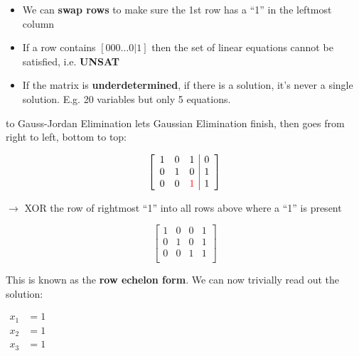\documentclass[aspectratio=196]{slides}
\def\TITLE#1{\hbox to \linewidth{\large #1\hfill}}
\def\BOTTOM{\vfill\newpage}
\def\SLIDE#1{\BOTTOM\TITLE{#1}}
\begin{document}
\begin{itemize}
\item We can \textbf{swap rows} to make sure the 1st row has a ``1'' in the leftmost column
\item If a row contains $[000\ldots0|1]$ then the set of linear equations cannot be satisfied, i.e. \textbf{UNSAT}
\item If the matrix is \textbf{underdetermined}, if there is a solution, it's never a single solution. E.g. 20 variables but only 5 equations.
\end{itemize}


\vfill
\newpage

\SLIDE{Gauss-Jordan Elimination}
Gauss-Jordan Elimination lets Gaussian Elimination finish, then goes from right to left, bottom to top:


\begin{minipage}{0.2\linewidth}
\[
\left[
\begin{array}{lll|l}
1 &            0 &           1 & 0\\
0 &            1 &           0 & 1\\
0 &            0 &           \color{red}{1} & 1\\
\end{array}
\right]
\]
\end{minipage}
\begin{minipage}{0.4\linewidth}
$\rightarrow$ XOR the row of rightmost ``1'' into all rows above where a ``1'' is present
\end{minipage}
\begin{minipage}{0.2\linewidth}
\[
\left[
\begin{array}{lll|l}
1 &            0 &           0 & 1\\
0 &            1 &           0 & 1\\
0 &            0 &           1 & 1\\
\end{array}
\right]
\]
\end{minipage}

This is known as the \textbf{row echelon form}. We can now trivially read out the solution:

$\begin{array}{ll}
x_1 &= 1\\
x_2 &= 1\\
x_3 &= 1\\
\end{array}$
\end{document}
